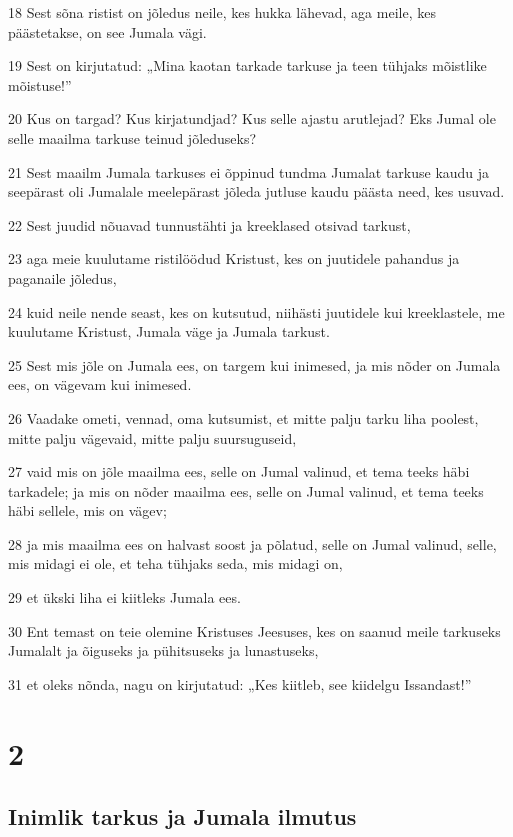 \par 18 Sest sõna ristist on jõledus neile, kes hukka lähevad, aga meile, kes päästetakse, on see Jumala vägi.
\par 19 Sest on kirjutatud: „Mina kaotan tarkade tarkuse ja teen tühjaks mõistlike mõistuse!”
\par 20 Kus on targad? Kus kirjatundjad? Kus selle ajastu arutlejad? Eks Jumal ole selle maailma tarkuse teinud jõleduseks?
\par 21 Sest maailm Jumala tarkuses ei õppinud tundma Jumalat tarkuse kaudu ja seepärast oli Jumalale meelepärast jõleda jutluse kaudu päästa need, kes usuvad.
\par 22 Sest juudid nõuavad tunnustähti ja kreeklased otsivad tarkust,
\par 23 aga meie kuulutame ristilöödud Kristust, kes on juutidele pahandus ja paganaile jõledus,
\par 24 kuid neile nende seast, kes on kutsutud, niihästi juutidele kui kreeklastele, me kuulutame Kristust, Jumala väge ja Jumala tarkust.
\par 25 Sest mis jõle on Jumala ees, on targem kui inimesed, ja mis nõder on Jumala ees, on vägevam kui inimesed.
\par 26 Vaadake ometi, vennad, oma kutsumist, et mitte palju tarku liha poolest, mitte palju vägevaid, mitte palju suursuguseid,
\par 27 vaid mis on jõle maailma ees, selle on Jumal valinud, et tema teeks häbi tarkadele; ja mis on nõder maailma ees, selle on Jumal valinud, et tema teeks häbi sellele, mis on vägev;
\par 28 ja mis maailma ees on halvast soost ja põlatud, selle on Jumal valinud, selle, mis midagi ei ole, et teha tühjaks seda, mis midagi on,
\par 29 et ükski liha ei kiitleks Jumala ees.
\par 30 Ent temast on teie olemine Kristuses Jeesuses, kes on saanud meile tarkuseks Jumalalt ja õiguseks ja pühitsuseks ja lunastuseks,
\par 31 et oleks nõnda, nagu on kirjutatud: „Kes kiitleb, see kiidelgu Issandast!”


\chapter{2}

\section*{Inimlik tarkus ja Jumala ilmutus}

